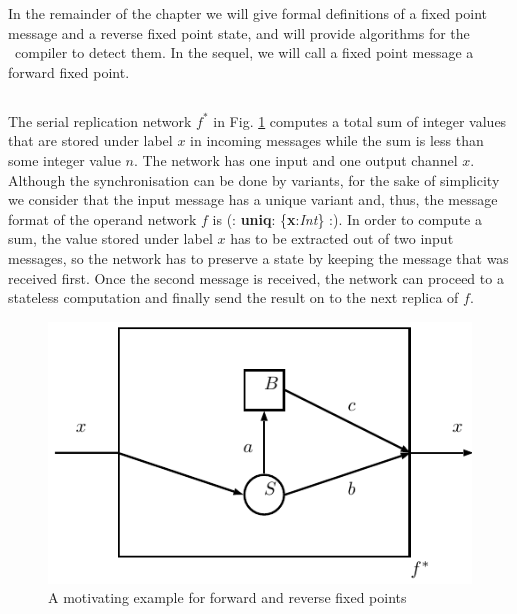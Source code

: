In the remainder of the chapter we will give formal definitions of a fixed point message and a reverse fixed point state, and will provide algorithms for the \ak\ compiler to detect them. In the sequel, we will call a fixed point message a forward fixed point.


    \subsection*{}

The serial replication network $f^{*}$ in Fig. \ref{fig:fp_examp} computes a total sum of integer values that are stored under label $x$ in incoming messages while the sum is less than some integer value $n$. The network has one input and one output channel $x$. Although the synchronisation can be done by variants, for the sake of simplicity we consider that the input message has a unique variant and, thus, the message format of the operand network $f$ is (: \textbf{uniq}: \{\textbf{x}:\emph{Int}\} :). In order to compute a sum, the value stored under label $x$ has to be extracted out of two input messages, so the network has to preserve a state by keeping the message that was received first. Once the second message is received, the network can proceed to a stateless computation and finally send the result on to the next replica of $f$.

\begin{figure}[h!]
\centering
\includegraphics[scale=0.8]{figs/chapter_04_fp_example.pdf}
\caption{A motivating example for forward and reverse fixed points}
\label{fig:fp_examp}
\end{figure}

